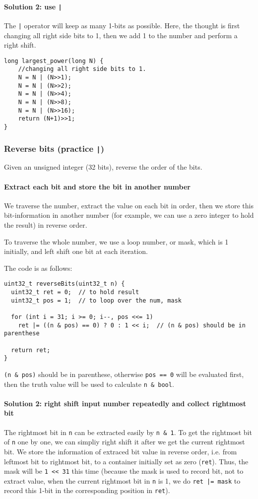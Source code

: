 \documentclass[12pt]{article}
\begin{document}
\paragraph{Solution 2: use \texttt{|}}
\label{sec:org4b881fa}
The \texttt{|} operator will keep as many 1-bits as possible. Here, the thought is first changing all right side bits to 1, then we add 1 to the number and perform a right shift.
\begin{verbatim}
long largest_power(long N) {
    //changing all right side bits to 1.
    N = N | (N>>1);
    N = N | (N>>2);
    N = N | (N>>4);
    N = N | (N>>8);
    N = N | (N>>16);
    return (N+1)>>1;
}
\end{verbatim}
\subsubsection{Reverse bits (practice \texttt{|})}
\label{sec:org82bd2d3}
Given an unsigned integer (32 bits), reverse the order of the bits.
\paragraph{Extract each bit and store the bit in another number}
\label{sec:orgc416428}
We traverse the number, extract the value on each bit in order, then we store this bit-information in another number (for example, we can use a zero integer to hold the result) in reverse order.

To traverse the whole number, we use a loop number, or mask, which is 1 initially, and left shift one bit at each iteration.

The code is as follows:
\begin{verbatim}
uint32_t reverseBits(uint32_t n) {
  uint32_t ret = 0;  // to hold result
  uint32_t pos = 1;  // to loop over the num, mask

  for (int i = 31; i >= 0; i--, pos <<= 1)
    ret |= ((n & pos) == 0) ? 0 : 1 << i;  // (n & pos) should be in parenthese

  return ret;
}
\end{verbatim}
\texttt{(n \& pos)} should be in parenthese, otherwise \texttt{pos == 0} will be evaluated first, then the truth value will be used to calculate \texttt{n \& bool}.
\paragraph{Solution 2: right shift input number repeatedly and collect rightmost bit}
\label{sec:orgd1a42d5}
The rightmost bit in \texttt{n} can be extracted easily by \texttt{n \& 1}. To get the rightmost bit of \texttt{n} one by one, we can simpliy right shift it after we get the current rightmost bit. We store the information of extraced bit value in reverse order, i.e. from leftmost bit to rightmost bit, to a container initially set as zero (\texttt{ret}). Thus, the mask will be \texttt{1 << 31} this time (because the mask is used to record bit, not to extract value, when the current rightmost bit in \texttt{n} is 1, we do \texttt{ret |= mask} to record this 1-bit in the corresponding position in \texttt{ret}).
\end{document}
